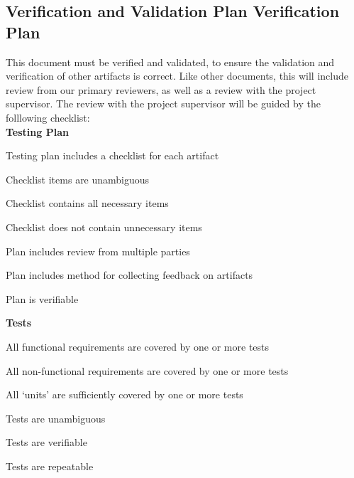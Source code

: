 \documentclass[12pt, titlepage]{article}
\begin{document}


\subsection{Verification and Validation Plan Verification Plan}
This document must be verified and validated, to ensure the validation and verification of other artifacts is correct. Like other documents, this will include review
from our primary reviewers, as well as a review with the project supervisor. The review with the project supervisor will be guided by the folllowing checklist:\\

\textbf{Testing Plan}\\
\begin{todolist}
  \item Testing plan includes a checklist for each artifact
  \item Checklist items are unambiguous
  \item Checklist contains all necessary items
  \item Checklist does not contain unnecessary items
  \item Plan includes review from multiple parties
  \item Plan includes method for collecting feedback on artifacts
  \item Plan is verifiable
  \end{todolist}
\textbf{Tests}\\
\begin{todolist}
  \item All functional requirements are covered by one or more tests\\
  \item All non-functional requirements are covered by one or more tests\\
  \item All `units' are sufficiently covered by one or more tests\\
  \item Tests are unambiguous
  \item Tests are verifiable
  \item Tests are repeatable
  \end{todolist}

\end{document}
